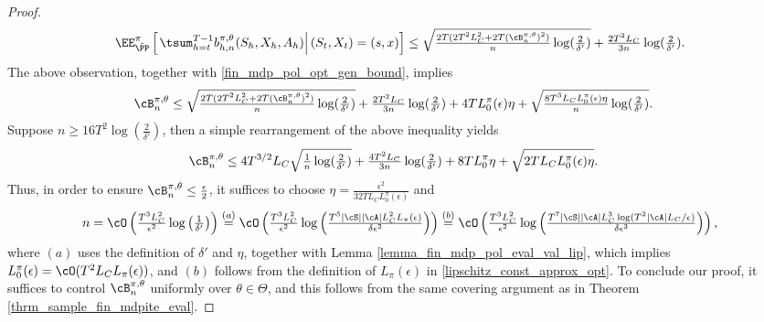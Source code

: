 \documentclass[9pt]{article}
\numberwithin{equation}{section}
\begin{document}
\begin{proof}
\begin{align*}
    \EE_{\tilde \PP}^\pi \left[\left. \tsum_{h=t}^{T-1}b_{h,n}^{\pi, \theta}(S_h, X_h, A_h)\right| (S_t, X_t) = (s,x) \right] 
    \leq 
    \sqrt{\tfrac{2  T (2T^2 L_C^2 + 2T (\cB^{\pi,\theta}_n)^2) }{n} \log(\tfrac{2}{\delta'})}
    + \tfrac{2T^2 L_C }{3n}\log(\tfrac{2}{\delta'}).
\end{align*}
The above observation, together with \eqref{fin_mdp_pol_opt_gen_bound},
implies 
%
\begin{align}
    \cB^{\pi,\theta}_n & \leq \sqrt{\tfrac{2  T (2T^2 L_C^2 + 2T (\cB^{\pi,\theta}_n)^2) }{n} \log(\tfrac{2}{\delta'})} + \tfrac{2T^2 L_C }{3n}\log(\tfrac{2}{\delta'}) + 4 T L_0^\pi(\epsilon) \eta + \sqrt{\tfrac{8T^3 L_C L_0^\pi(\epsilon) \eta }{n} \log(\tfrac{2}{\delta'})}. \label{fin_mdp_pol_opt_B_final_ineq}
\end{align}
%
Suppose $n \geq 16 T^2 \log(\tfrac{2}{\delta'})$, then a simple rearrangement of the above inequality yields
%
\begin{align*}
    \cB^{\pi,\theta}_n & \leq 4 T^{3/2} L_C\sqrt{\tfrac{1}{n} \log (\tfrac{2}{\delta'})} + \tfrac{4T^2 L_C }{3n} \log(\tfrac{2}{\delta'}) + 8 T L_0^\pi \eta + \sqrt{2 T L_C L_0^\pi (\epsilon) \eta}.
\end{align*}
%
Thus, in order to ensure $\cB^{\pi,\theta}_n \leq \tfrac{\epsilon}{2}$, it suffices to choose $\eta = \tfrac{\epsilon^2}{32 T L_C L_0^\pi (\epsilon)}$ and
%
\begin{align}
    n  = \cO\left(\tfrac{T^3 L_C^2}{\epsilon^2} \log \left(\tfrac{1}{\delta'} \right)\right) \overset{(a)}{=} \cO \left( \tfrac{T^3 L_C^2}{\epsilon^2} \log \left(\tfrac{T^5 |\cS| |\cA| L_C^2 L_\pi (\epsilon)}{\delta \epsilon^2} \right) \right)
\overset{(b)}{=} \cO \left( \tfrac{T^3 L_C^2}{\epsilon^2} \log \left(\tfrac{T^7 |\cS| |\cA| L_C^3 \log(T^2|\cA|L_C/\epsilon)}{\delta \epsilon^3} \right) \right)
    \nonumber ,
\end{align}
%
where $(a)$ uses the definition of $\delta'$ and $\eta$, together with Lemma \ref{lemma_fin_mdp_pol_eval_val_lip},
which implies $L_0^\pi(\epsilon) = \cO(T^2L_CL_\pi(\epsilon))$,
and $(b)$ follows from the definition of $L_\pi(\epsilon)$ in \eqref{lipschitz_const_approx_opt}.
To conclude our proof, it suffices to control $\cB^{\pi,\theta}_n$ uniformly over $\theta \in \Theta$,
 and this follows from  the same covering argument as in Theorem \ref{thrm_sample_fin_mdpite_eval}.
\end{proof}
\end{document}
